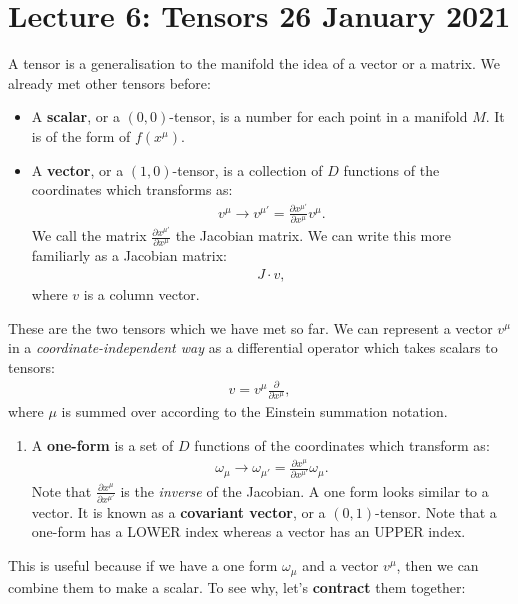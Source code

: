 \documentclass[11pt]{article}
\theoremstyle{definition}
\begin{document}
\section{Lecture 6: Tensors 26 January 2021}
A tensor is a generalisation to the manifold the idea of a vector or a matrix. We already met other tensors before: 
\begin{itemize}[noitemsep]
	\item A \textbf{scalar}, or a \( (0,0) \)-tensor, is a number for each point in a manifold \( M \). It is of the form of \( f(x^\mu) \).
	\item A \textbf{vector}, or a \( (1,0) \)-tensor, is a collection of \( D \) functions of the coordinates which transforms as:
	\begin{align*}
		v^\mu \rightarrow v^{\mu'} = \frac{\partial x^{\mu'}}{\partial x^{\mu}} v^{\mu}.
	\end{align*}
	We call the matrix \( \frac{\partial x^{\mu'}}{\partial x^{\mu}}  \) the Jacobian matrix. We can write this more familiarly as a Jacobian matrix: 
	\begin{align*}
		J \cdot v, 
	\end{align*}
	where \( v \) is a column vector. 
\end{itemize} 
These are the two tensors which we have met so far. We can represent a vector \( v^{\mu} \) in a \emph{coordinate-independent way} as a differential operator which takes scalars to tensors: 
\begin{align*}
	v = v^\mu \frac{\partial }{\partial x^\mu}, 
\end{align*}
where \( \mu \) is summed over according to the Einstein summation notation. 
\begin{enumerate}[noitemsep]
	\item A \textbf{one-form} is a set of \( D \) functions of the coordinates which transform as: 
	\begin{align*}
		\omega_\mu \rightarrow \omega_{\mu'} = \frac{\partial x^\mu}{\partial x^{\mu'}} \omega_\mu.
	\end{align*}
	Note that \( \frac{\partial x^\mu}{\partial x^{\mu'}} \) is the \emph{inverse} of the Jacobian. A one form looks similar to a vector. It is known as a \textbf{covariant vector}, or a \( (0,1) \)-tensor. Note that a one-form has a LOWER index whereas a vector has an UPPER index. 
\end{enumerate}
This is useful because if we have a one form \( \omega_\mu \) and a vector \( v^\mu \), then we can combine them to make a scalar. To see why, let's \textbf{contract} them together:
\end{document}
